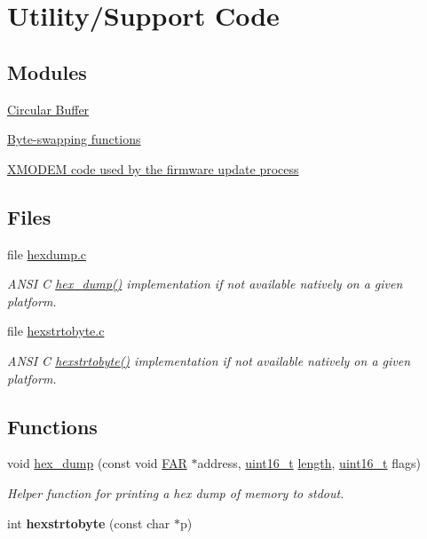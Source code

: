 \hypertarget{group__util}{\section{Utility/\-Support Code}
\label{group__util}
}
\subsection*{Modules}
\begin{DoxyCompactItemize}
\item 
\hyperlink{group__util__cbuf}{Circular Buffer}
\item 
\hyperlink{group__util__byteorder}{Byte-\/swapping functions}
\item 
\hyperlink{group__util__xmodem}{X\-M\-O\-D\-E\-M code used by the firmware update process}
\end{DoxyCompactItemize}
\subsection*{Files}
\begin{DoxyCompactItemize}
\item 
file \hyperlink{hexdump_8c}{hexdump.\-c}
\begin{DoxyCompactList}\small\item\em A\-N\-S\-I C \hyperlink{group__util_gaa321236a0cb6f4e0dad592fdf1b550d2}{hex\-\_\-dump()} implementation if not available natively on a given platform. \end{DoxyCompactList}\item 
file \hyperlink{hexstrtobyte_8c}{hexstrtobyte.\-c}
\begin{DoxyCompactList}\small\item\em A\-N\-S\-I C \hyperlink{group__hal_ga519e5ae2049b59689a474a8c48fee353}{hexstrtobyte()} implementation if not available natively on a given platform. \end{DoxyCompactList}\end{DoxyCompactItemize}
\subsection*{Functions}
\begin{DoxyCompactItemize}
\item 
void \hyperlink{group__util_gaa321236a0cb6f4e0dad592fdf1b550d2}{hex\-\_\-dump} (const void \hyperlink{group__hal_gaef060b3456fdcc093a7210a762d5f2ed}{F\-A\-R} $\ast$address, \hyperlink{group__hal_ga5a8b2dc9e45a9ee81a94ef304fb62505}{uint16\-\_\-t} \hyperlink{group__zdo_gab2b3adeb2a67e656ff030b56727fd0ac}{length}, \hyperlink{group__hal_ga5a8b2dc9e45a9ee81a94ef304fb62505}{uint16\-\_\-t} flags)
\begin{DoxyCompactList}\small\item\em Helper function for printing a hex dump of memory to stdout. \end{DoxyCompactList}\item 
\hypertarget{group__util_ga7ef9d8eaba1a5730261c557b1cb0a36b}{int {\bfseries hexstrtobyte} (const char $\ast$p)}\label{group__util_ga7ef9d8eaba1a5730261c557b1cb0a36b}

\end{DoxyCompactItemize}


